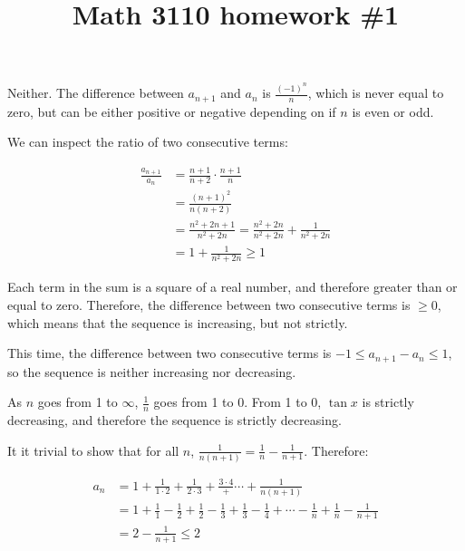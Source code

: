

\title{Math 3110 homework \#1}
\author{\name}
\maketitle


Neither. The difference between $a_{n + 1}$ and $a_n$ is $\frac{(-1)^n}{n}$, which is never equal to zero, but can be either positive or negative depending on if $n$ is even or odd.

We can inspect the ratio of two consecutive terms:

\begin{align*}
  \frac{a_{n + 1}}{a_n} &= \frac{n + 1}{n + 2} \cdot \frac{n + 1}{n} \\
  &= \frac{(n + 1)^2}{n(n + 2)} \\
  &= \frac{n^2 + 2n + 1}{n^2 + 2n} = \frac{n^2 + 2n}{n^2 + 2n} + \frac{1}{n^2 + 2n} \\
  &= 1 + \frac{1}{n^2 + 2n} \geq 1
\end{align*}

Each term in the sum is a square of a real number, and therefore greater than or equal to zero. Therefore, the difference between two consecutive terms is $\geq 0$, which means that the sequence is increasing, but not strictly.

This time, the difference between two consecutive terms is $-1 \leq a_{n + 1} - a_n \leq 1$, so the sequence is neither increasing nor decreasing.

As $n$ goes from 1 to $\infty$, $\frac{1}{n}$ goes from 1 to 0. From 1 to 0, $\tan x$ is strictly decreasing, and therefore the sequence is strictly decreasing.




It it trivial to show that for all $n$, $\frac{1}{n(n + 1)} = \frac{1}{n} - \frac{1}{n + 1}$. Therefore:

\begin{align*}
  a_n &= 1 + \frac{1}{1 \cdot 2} + \frac{1}{2 \cdot 3} + \frac{3 \cdot 4} + \cdots + \frac{1}{n(n + 1)} \\
  &= 1 + \frac{1}{1} - \frac{1}{2} + \frac{1}{2} - \frac{1}{3} + \frac{1}{3} - \frac{1}{4} + \cdots - \frac{1}{n} + \frac{1}{n} - \frac{1}{n + 1} \\
  &= 2 - \frac{1}{n + 1} \leq 2
\end{align*}


